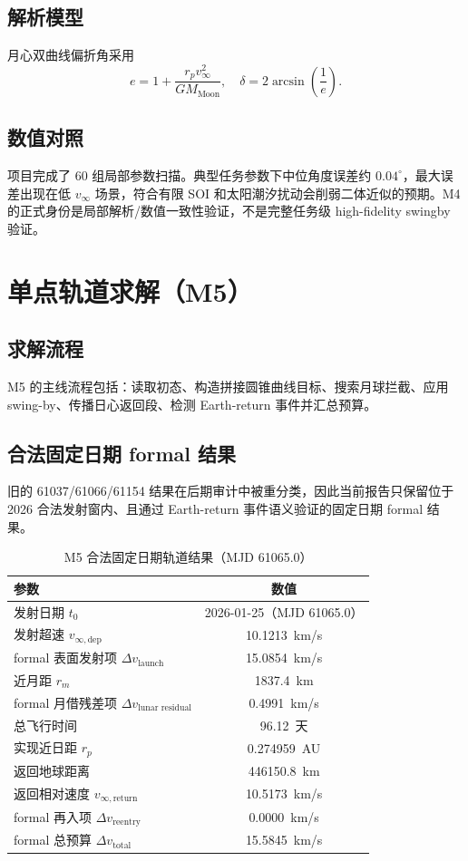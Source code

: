 \documentclass[12pt,a4paper]{ctexart}
\begin{document}
\subsection{解析模型}
月心双曲线偏折角采用
\begin{equation}
e = 1 + \frac{r_p v_\infty^2}{GM_{\text{Moon}}},\quad
\delta = 2\arcsin\left(\frac{1}{e}\right).
\end{equation}

\subsection{数值对照}
项目完成了 60 组局部参数扫描。典型任务参数下中位角度误差约 $0.04^\circ$，最大误差出现在低 $v_\infty$ 场景，符合有限 SOI 和太阳潮汐扰动会削弱二体近似的预期。M4 的正式身份是局部解析/数值一致性验证，不是完整任务级 high-fidelity swingby 验证。

\newpage

\section{单点轨道求解（M5）}
\subsection{求解流程}
M5 的主线流程包括：读取初态、构造拼接圆锥曲线目标、搜索月球拦截、应用 swing-by、传播日心返回段、检测 Earth-return 事件并汇总预算。

\subsection{合法固定日期 formal 结果}
旧的 61037/61066/61154 结果在后期审计中被重分类，因此当前报告只保留位于 2026 合法发射窗内、且通过 Earth-return 事件语义验证的固定日期 formal 结果。

\begin{table}[H]
\centering
\caption{M5 合法固定日期轨道结果（MJD 61065.0）}
\begin{tabular}{lc}
\toprule
参数 & 数值 \\
\midrule
发射日期 $t_0$ & 2026-01-25（MJD 61065.0） \\
发射超速 $v_{\infty,\text{dep}}$ & 10.1213~km/s \\
formal 表面发射项 $\Delta v_{\text{launch}}$ & 15.0854~km/s \\
近月距 $r_m$ & 1837.4~km \\
formal 月借残差项 $\Delta v_{\text{lunar residual}}$ & 0.4991~km/s \\
总飞行时间 & 96.12~天 \\
实现近日距 $r_p$ & 0.274959~AU \\
返回地球距离 & 446150.8~km \\
返回相对速度 $v_{\infty,\text{return}}$ & 10.5173~km/s \\
formal 再入项 $\Delta v_{\text{reentry}}$ & 0.0000~km/s \\
formal 总预算 $\Delta v_{\text{total}}$ & 15.5845~km/s \\
\bottomrule
\end{tabular}
\end{table}
\end{document}

